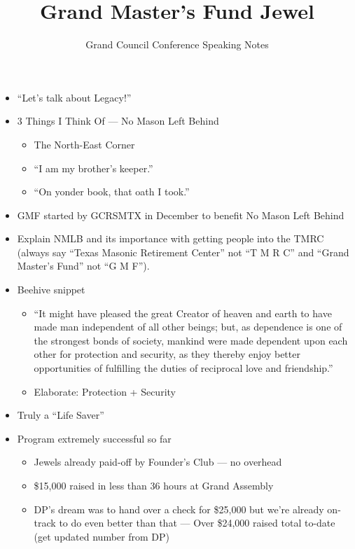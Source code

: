 \documentclass{article}
\title{\vspace*{-3em}Grand Master's Fund Jewel}
\author{Grand Council Conference Speaking Notes}
\date{}
\begin{document}
	\maketitle
		
		\begin{itemize}
			\item ``Let's talk about Legacy!''
			\item 3 Things I Think Of --- No Mason Left Behind
				\begin{itemize}
					\item The North-East Corner
					\item ``I am my brother's keeper.''
					\item ``On yonder book, that oath I took.''
				\end{itemize}
			\item GMF started by GCRSMTX in December to benefit No Mason Left Behind
			\item Explain NMLB and its importance with getting people into the TMRC (always say ``Texas Masonic Retirement Center'' not ``T M R C'' and ``Grand Master's Fund'' not ``G M F'').
			\item Beehive snippet
				\begin{itemize}
					\item ``It might have pleased the great Creator of heaven and earth to have made man independent of all other beings; but, as dependence is one of the strongest bonds of society, mankind were made dependent upon each other for protection and security, as they thereby enjoy better opportunities of fulfilling the duties of reciprocal love and friendship.''
					\item Elaborate: Protection + Security
				\end{itemize}
			\item Truly a ``Life Saver''
			\item Program extremely successful so far
			\begin{itemize}
				\item Jewels already paid-off by Founder's Club --- no overhead
				\item \$15,000 raised in less than 36 hours at Grand Assembly
				\item DP's dream was to hand over a check for \$25,000 but we're already on-track to do even better than that --- Over \$24,000 raised total to-date (get updated number from DP)

\end{itemize}
\end{itemize}
\end{document}
